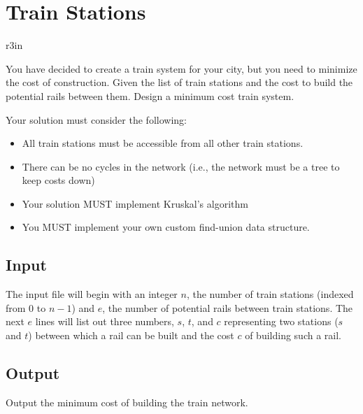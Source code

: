 \documentclass[11pt]{article}
\begin{document}
\section*{Train Stations}


\begin{wrapfigure}{r}{3in}
\vspace{-10pt}
\vspace{-30pt}
\end{wrapfigure}

You have decided to create a train system for your city, but you need to minimize the cost of construction. Given the list of train stations and the cost to build the potential rails between them. Design a minimum cost train system.

Your solution must consider the following:

\begin{itemize}
	\item All train stations must be accessible from all other train stations.
	\item There can be no cycles in the network (i.e., the network must be a tree to keep costs down)
	\item Your solution MUST implement Kruskal's algorithm
	\item You MUST implement your own custom find-union data structure.
\end{itemize}

\subsection*{Input}
The input file will begin with an integer $n$, the number of train stations (indexed from $0$ to $n-1$) and $e$, the number of potential rails between train stations. The next $e$ lines will list out three numbers, $s$, $t$, and $c$ representing two stations ($s$ and $t$) between which a rail can be built and the cost $c$ of building such a rail.

\subsection*{Output}

Output the minimum cost of building the train network.
\end{document}
